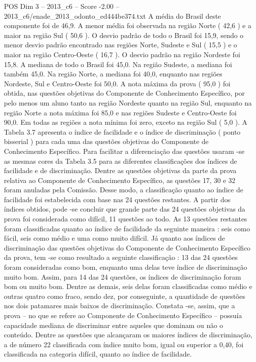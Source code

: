 \begin{textsample}{POS Dim 3 – 2013\_c6 – Score -2.00 – 2013\_c6/enade\_2013\_odonto\_ed444be374.txt}
A média do Brasil deste componente foi de 46,9.
A menor média foi observada na região Norte ( 42,6 ) e a maior na região Sul ( 50,6 ).
O desvio padrão de todo o Brasil foi 15,9, sendo o menor desvio padrão encontrado nas regiões Norte, Sudeste e Sul ( 15,5 ) e o maior na região Centro-Oeste ( 16,7 ).
O desvio padrão na região Nordeste foi 15,8.
A mediana de todo o Brasil foi 45,0.
Na região Sudeste, a mediana foi também 45,0.
Na região Norte, a mediana foi 40,0, enquanto nas regiões Nordeste, Sul e Centro-Oeste foi 50,0.
A nota máxima da prova ( 95,0 ) foi obtida, nas questões objetivas do Componente de Conhecimento Específico, por pelo menos um aluno tanto na região Nordeste quanto na região Sul, enquanto na região Norte a nota máxima foi 85,0 e nas regiões Sudeste e Centro-Oeste foi 90,0.
Em todas as regiões a nota mínima foi zero, exceto na região Sul ( 5,0 ).
A Tabela 3.7 apresenta o índice de facilidade e o índice de discriminação ( ponto bisserial ) para cada uma das questões objetivas do Componente de Conhecimento Específico.
Para facilitar a diferenciação das questões usaram -se as mesmas cores da Tabela 3.5 para as diferentes classificações dos índices de facilidade e de discriminação.
Dentre as questões objetivas da parte da prova relativa ao Componente de Conhecimento Específico, as questões 17, 30 e 32 foram anuladas pela Comissão.
Desse modo, a classificação quanto ao índice de facilidade foi estabelecida com base nas 24 questões restantes.
A partir dos índices obtidos, pode -se concluir que grande parte das 24 questões objetivas da prova foi considerada como difícil, 11 questões ao todo.
As 13 questões restantes foram classificadas quanto ao índice de facilidade da seguinte maneira : seis como fácil, seis como médio e uma como muito difícil.
Já quanto aos índices de discriminação das questões objetivas do Componente de Conhecimento Específico da prova, tem -se como resultado a seguinte classificação : 13 das 24 questões foram consideradas como bom, enquanto uma delas teve índice de discriminação muito bom.
Assim, para 14 das 24 questões, os índices de discriminação foram bom ou muito bom.
Dentre as demais, seis delas foram classificadas como médio e outras quatro como fraco, sendo dez, por conseguinte, a quantidade de questões nos dois patamares mais baixos de discriminação.
Constata -se, assim, que a prova – no que se refere ao Componente de Conhecimento Específico – possuía capacidade mediana de discriminar entre aqueles que dominam ou não o conteúdo.
Dentre as questões que alcançaram os maiores índices de discriminação, a de número 22 classificada com índice muito bom, igual ou superior a 0,40, foi classificada na categoria difícil, quanto ao índice de facilidade.

\end{textsample}
